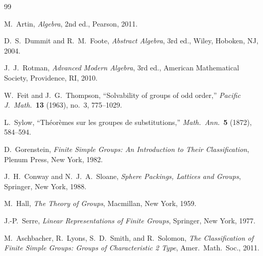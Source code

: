 \documentclass[12pt,a4paper]{amsart}
\theoremstyle{definition}
\begin{document}
\begin{thebibliography}{99}

M.~Artin, \emph{Algebra}, 2nd ed., Pearson, 2011.

D.~S.~Dummit and R.~M.~Foote, \emph{Abstract Algebra}, 3rd ed.,
Wiley, Hoboken, NJ, 2004.

J.~J.~Rotman, \emph{Advanced Modern Algebra}, 3rd ed., American Mathematical
Society, Providence, RI, 2010.

W.~Feit and J.~G.~Thompson, ``Solvability of groups of odd order,''
\emph{Pacific J.\ Math.}\ \textbf{13} (1963), no.~3, 775--1029.

L.~Sylow, ``Th\'{e}or\`{e}mes sur les groupes de substitutions,''
\emph{Math.\ Ann.}\ \textbf{5} (1872), 584--594.

D.~Gorenstein, \emph{Finite Simple Groups: An Introduction to Their
Classification}, Plenum Press, New York, 1982.

J.~H.~Conway and N.~J.~A.~Sloane, \emph{Sphere Packings, Lattices and Groups},
Springer, New York, 1988.

M.~Hall, \emph{The Theory of Groups}, Macmillan, New York, 1959.

J.-P.~Serre, \emph{Linear Representations of Finite Groups}, Springer, New York,
1977.

M.~Aschbacher, R.~Lyons, S.~D.~Smith, and R.~Solomon,
\emph{The Classification of Finite Simple Groups: Groups of Characteristic 2 Type},
Amer.\ Math.\ Soc., 2011.

\end{thebibliography}
\end{document}

